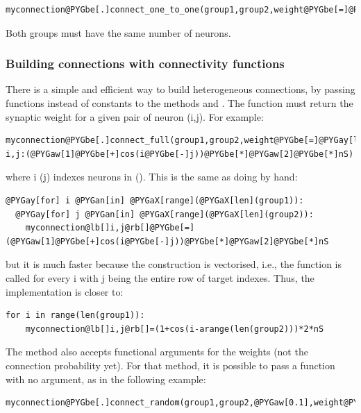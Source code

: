 \documentclass[letterpaper,10pt]{manual}
\begin{document}
\begin{Verbatim}[commandchars=@\[\]]
myconnection@PYGbe[.]connect_one_to_one(group1,group2,weight@PYGbe[=]@PYGaw[3]@PYGbe[*]nS)
\end{Verbatim}

Both groups must have the same number of neurons.


\subsubsection{Building connections with connectivity functions}

There is a simple and efficient way to build heterogeneous connections, by passing functions
instead of constants to the methods  and .
The function must return the synaptic weight for a given pair of neuron (i,j).
For example:

\begin{Verbatim}[commandchars=@\[\]]
myconnection@PYGbe[.]connect_full(group1,group2,weight@PYGbe[=]@PYGay[lambda] i,j:(@PYGaw[1]@PYGbe[+]cos(i@PYGbe[-]j))@PYGbe[*]@PYGaw[2]@PYGbe[*]nS)
\end{Verbatim}

where i (j) indexes neurons in  (). This is the same as doing by hand:

\begin{Verbatim}[commandchars=@\[\]]
@PYGay[for] i @PYGan[in] @PYGaX[range](@PYGaX[len](group1)):
  @PYGay[for] j @PYGan[in] @PYGaX[range](@PYGaX[len](group2)):
    myconnection@lb[]i,j@rb[]@PYGbe[=](@PYGaw[1]@PYGbe[+]cos(i@PYGbe[-]j))@PYGbe[*]@PYGaw[2]@PYGbe[*]nS
\end{Verbatim}

but it is much faster because the construction is vectorised, i.e., the function is called for every i
with j being the entire row of target indexes. Thus, the implementation is closer to:

\begin{Verbatim}[commandchars=@\[\]]
for i in range(len(group1)):
    myconnection@lb[]i,j@rb[]=(1+cos(i-arange(len(group2)))*2*nS
\end{Verbatim}

The method  also accepts functional arguments for the
weights (not the connection probability yet). For that method, it is possible to pass a function
with no argument, as in the following example:

\begin{Verbatim}[commandchars=@\[\]]
myconnection@PYGbe[.]connect_random(group1,group2,@PYGaw[0.1],weight@PYGbe[=]@PYGay[lambda]:rand()@PYGbe[*]nS)
\end{Verbatim}
\end{document}
